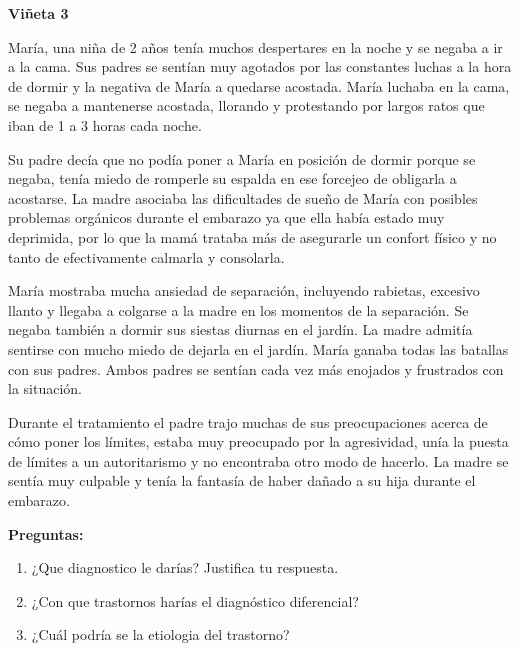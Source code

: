 \documentclass[12pt,a4paper]{article}
\begin{document}
\begin{shaded}
\textbf{Viñeta 3}

María, una niña de 2 años tenía muchos despertares en la noche y se negaba
a ir a la cama. Sus padres se sentían muy agotados por las constantes luchas
a la hora de dormir y la negativa de María a quedarse acostada. María luchaba
en la cama, se negaba a mantenerse acostada, llorando y protestando por
largos ratos que iban de 1 a 3 horas cada noche.

Su padre decía que no podía poner a María en posición de dormir porque se
negaba, tenía miedo de romperle su espalda en ese forcejeo de obligarla a
acostarse. La madre asociaba las dificultades de sueño de María con posibles
problemas orgánicos durante el embarazo ya que ella había estado muy
deprimida, por lo que la mamá trataba más de asegurarle un confort físico y no
tanto de efectivamente calmarla y consolarla.

María mostraba mucha ansiedad de separación, incluyendo rabietas, excesivo
llanto y llegaba a colgarse a la madre en los momentos de la separación. Se
negaba también a dormir sus siestas diurnas en el jardín. La madre admitía
sentirse con mucho miedo de dejarla en el jardín. María ganaba todas las
batallas con sus padres. Ambos padres se sentían cada vez más enojados y
frustrados con la situación.

Durante el tratamiento el padre trajo muchas de sus preocupaciones acerca de
cómo poner los límites, estaba muy preocupado por la agresividad, unía la
puesta de límites a un autoritarismo y no encontraba otro modo de hacerlo. La
madre se sentía muy culpable y tenía la fantasía de haber dañado a su hija
durante el embarazo.
\end{shaded}


\vspace{1cm}

\textbf{Preguntas:}

\begin{enumerate}
	\item ¿Que diagnostico le darías? Justifica tu respuesta.
	\item ¿Con que trastornos harías el diagnóstico diferencial?
	\item ¿Cuál podría se la etiologia del trastorno?
\end{enumerate}



\newpage
\printbibliography[title={Bibliografía}]
\end{document}
